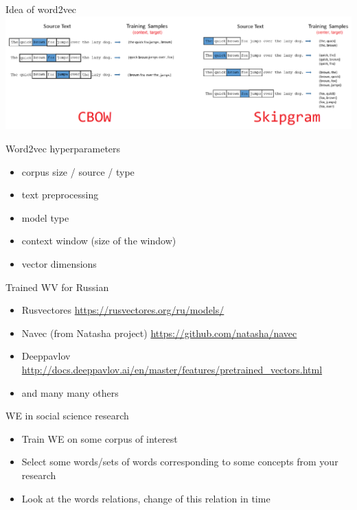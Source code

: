 \documentclass[svgnames]{beamer}
\begin{document}
    \begin{frame}{Idea of word2vec}
        \includegraphics[width=\textwidth]{cbow_sgns2}
    \end{frame}

    \begin{frame}{Word2vec hyperparameters}
        \begin{itemize}
            \item corpus size / source / type
            \item text preprocessing
            \item model type
            \item context window (size of the window)
            \item vector dimensions
        \end{itemize}
    \end{frame}


    \begin{frame}{Trained WV for Russian}
        \begin{itemize}
            \item Rusvectores \url{https://rusvectores.org/ru/models/}
            \item Navec (from Natasha project) \url{https://github.com/natasha/navec}
            \item Deeppavlov \url{http://docs.deeppavlov.ai/en/master/features/pretrained_vectors.html}
            \item and many many others
        \end{itemize}
    \end{frame}


    \begin{frame}{WE in social science research}
        \begin{itemize}
            \item Train WE on some corpus of interest
            \item Select some words/sets of words corresponding to some concepts from your research
            \item Look at the words relations, change of this relation in time
        \end{itemize}
    \end{frame}
\end{document}
